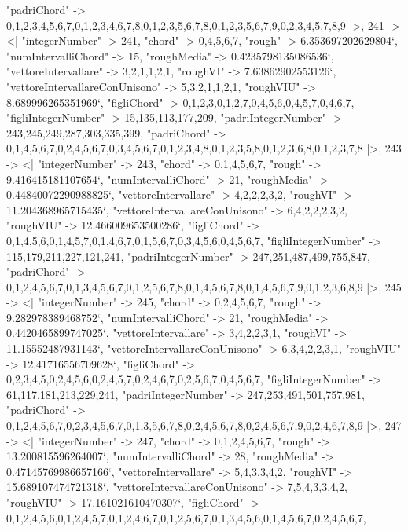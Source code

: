 \documentclass[
]{article}
\begin{document}
\begin{DatasetVerbatim}
    "padriChord" -> {{0,1,2,3,4,5,6,7},{0,1,2,3,4,6,7,8},{0,1,2,3,5,6,7,8},{0,1,2,3,5,6,7,9},{0,2,3,4,5,7,8,9}}
  |>,
  241 -> <|
    "integerNumber" -> 241,
    "chord" -> {0,4,5,6,7},
    "rough" -> 6.353697202629804`,
    "numIntervalliChord" -> 15,
    "roughMedia" -> 0.4235798135086536`,
    "vettoreIntervallare" -> {3,2,1,1,2,1},
    "roughVI" -> 7.63862902553126`,
    "vettoreIntervallareConUnisono" -> {5,3,2,1,1,2,1},
    "roughVIU" -> 8.689996265351969`,
    "figliChord" -> {{0,1,2,3},{0,1,2,7},{0,4,5,6},{0,4,5,7},{0,4,6,7}},
    "figliIntegerNumber" -> {15,135,113,177,209},
    "padriIntegerNumber" -> {243,245,249,287,303,335,399},
    "padriChord" -> {{0,1,4,5,6,7},{0,2,4,5,6,7},{0,3,4,5,6,7},{0,1,2,3,4,8},{0,1,2,3,5,8},{0,1,2,3,6,8},{0,1,2,3,7,8}}
  |>,
  243 -> <|
    "integerNumber" -> 243,
    "chord" -> {0,1,4,5,6,7},
    "rough" -> 9.416415181107654`,
    "numIntervalliChord" -> 21,
    "roughMedia" -> 0.44840072290988825`,
    "vettoreIntervallare" -> {4,2,2,2,3,2},
    "roughVI" -> 11.204368965715435`,
    "vettoreIntervallareConUnisono" -> {6,4,2,2,2,3,2},
    "roughVIU" -> 12.466009653500286`,
    "figliChord" -> {{0,1,4,5,6},{0,1,4,5,7},{0,1,4,6,7},{0,1,5,6,7},{0,3,4,5,6},{0,4,5,6,7}},
    "figliIntegerNumber" -> {115,179,211,227,121,241},
    "padriIntegerNumber" -> {247,251,487,499,755,847},
    "padriChord" -> {{0,1,2,4,5,6,7},{0,1,3,4,5,6,7},{0,1,2,5,6,7,8},{0,1,4,5,6,7,8},{0,1,4,5,6,7,9},{0,1,2,3,6,8,9}}
  |>,
  245 -> <|
    "integerNumber" -> 245,
    "chord" -> {0,2,4,5,6,7},
    "rough" -> 9.282978389468752`,
    "numIntervalliChord" -> 21,
    "roughMedia" -> 0.4420465899747025`,
    "vettoreIntervallare" -> {3,4,2,2,3,1},
    "roughVI" -> 11.15552487931143`,
    "vettoreIntervallareConUnisono" -> {6,3,4,2,2,3,1},
    "roughVIU" -> 12.41716556709628`,
    "figliChord" -> {{0,2,3,4,5},{0,2,4,5,6},{0,2,4,5,7},{0,2,4,6,7},{0,2,5,6,7},{0,4,5,6,7}},
    "figliIntegerNumber" -> {61,117,181,213,229,241},
    "padriIntegerNumber" -> {247,253,491,501,757,981},
    "padriChord" -> {{0,1,2,4,5,6,7},{0,2,3,4,5,6,7},{0,1,3,5,6,7,8},{0,2,4,5,6,7,8},{0,2,4,5,6,7,9},{0,2,4,6,7,8,9}}
  |>,
  247 -> <|
    "integerNumber" -> 247,
    "chord" -> {0,1,2,4,5,6,7},
    "rough" -> 13.200815596264007`,
    "numIntervalliChord" -> 28,
    "roughMedia" -> 0.47145769986657166`,
    "vettoreIntervallare" -> {5,4,3,3,4,2},
    "roughVI" -> 15.689107474721318`,
    "vettoreIntervallareConUnisono" -> {7,5,4,3,3,4,2},
    "roughVIU" -> 17.161021610470307`,
    "figliChord" -> {{0,1,2,4,5,6},{0,1,2,4,5,7},{0,1,2,4,6,7},{0,1,2,5,6,7},{0,1,3,4,5,6},{0,1,4,5,6,7},{0,2,4,5,6,7}},

\end{DatasetVerbatim}
\end{document}
